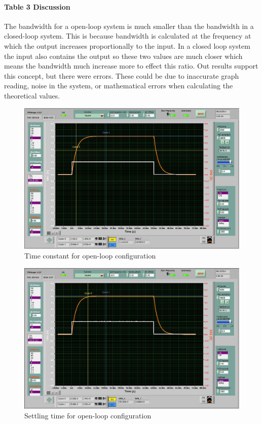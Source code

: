 \documentclass[12pt]{article}
\begin{document}
\paragraph{Table 3 Discussion} %
\label{par:table_3_discussion}
The bandwidth for a open-loop system is much smaller than the bandwidth in a closed-loop system. This is because bandwidth is calculated at the frequency at which the output increases proportionally to the input. In a closed loop system the input also contains the output so these two values are much closer which means the bandwidth much increase more to effect this ratio. Out results support this concept, but there were errors. These could be due to inaccurate graph reading, noise in the system, or mathematical errors when calculating the theoretical values.

\begin{figure}[ht]
\centering
\includegraphics[width=7in]{TimeConstantOpen.jpg}
\caption{Time constant for open-loop configuration}
\label{fig:time-open}
\end{figure}

\begin{figure}[ht]
\centering
\includegraphics[width=7in]{SettlingOpen.jpg}
\caption{Settling time for open-loop configuration}
\label{fig:settle-open}
\end{figure}
\end{document}
